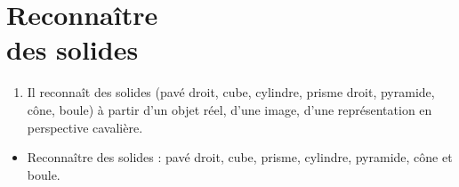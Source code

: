 \themaE
\graphicspath{{../../S18_Reconnaitre_des_solides/Images/}}
          
\chapter{Reconnaître\\des solides}
\label{S18}


\newcommand{\cone}{\pspolygon[fillstyle=solid,fillcolor=white](0,0)(0.9,0)(0.45,1.7)}
\newcommand{\boule}{\pscircle[fillstyle=solid,fillcolor=white](0,0.45){0.45}}
\newcommand{\cube}{\psframe[fillstyle=solid,fillcolor=white](0,0)(1.15,0.9)\psline(0.75,0)(0.75,0.9)}
\newcommand{\cubeg}{\psframe[fillstyle=solid,fillcolor=white](0,0)(1.15,0.9)\psline(0.4,0)(0.4,0.9)}


\begin{autoeval}
   \small
   \begin{enumerate}
      \item Il reconnaît des solides (pavé droit, cube, cylindre, prisme droit, pyramide, cône, boule) à partir d’un objet réel, d’une image, d’une représentation en perspective cavalière.
   \end{enumerate}
\end{autoeval}

\begin{prerequis}
   \begin{itemize}
      \item Reconnaître des solides : pavé droit, cube, prisme, cylindre, pyramide, cône et boule.
   \end{itemize}
\end{prerequis}

\vfill

